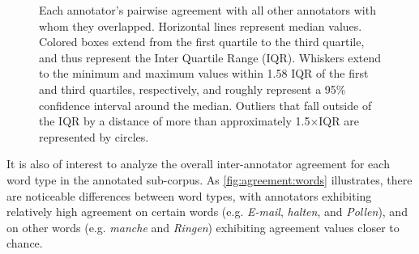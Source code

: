 \begin{figure}[p]
			\vspace{1em}	

			
			\caption[Pairwise agreement statistics by annotator]{Each annotator's pairwise agreement with all other annotators with whom they overlapped.
			Horizontal lines represent median values. Colored boxes extend from the first quartile to the third quartile, and thus represent the Inter Quartile Range (IQR). Whiskers extend to the minimum and maximum values within 1.58 IQR of the first and third quartiles, respectively, and roughly represent a 95\% confidence interval around the median. 
			 Outliers that fall outside of the IQR by a distance of more than approximately 1.5$\times$IQR  are represented by circles.%
			}
			
			
			\label{fig:agreement:annotators}
		\end{figure}
		
		It is also of interest to analyze the overall inter-annotator agreement for each word type in the annotated sub-corpus. As \cref{fig:agreement:words} illustrates, there are noticeable differences between word types, with annotators exhibiting relatively high agreement on certain words (e.g. \textit{E-mail}, \textit{halten}, and \textit{Pollen}), and on other words (e.g. \textit{manche} and \textit{Ringen}) exhibiting agreement values closer to chance. 
		
